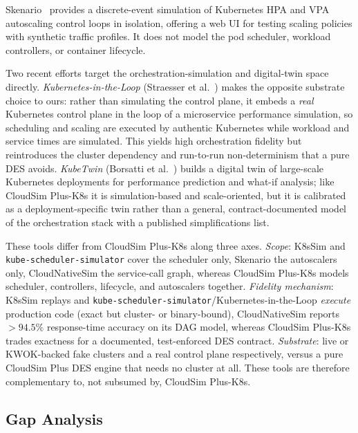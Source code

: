 \documentclass[ASNA,twocolumn]{USG}
\newcommand{\ckm}{CloudSim Plus-K8s\xspace}
\begin{document}
    Skenario~\cite{Skenario} provides a discrete-event simulation of
    Kubernetes HPA and VPA autoscaling control loops in isolation,
    offering a web UI for testing scaling policies with synthetic traffic
    profiles. It does not model the pod scheduler, workload controllers,
    or container lifecycle.

    Two recent efforts target the orchestration-simulation and
    digital-twin space directly. \emph{Kubernetes-in-the-Loop}
    (Straesser et al.~\cite{Straesser2023}) makes the opposite substrate
    choice to ours: rather than simulating the control plane, it embeds a
    \emph{real} Kubernetes control plane in the loop of a microservice
    performance simulation, so scheduling and scaling are executed by
    authentic Kubernetes while workload and service times are simulated.
    This yields high orchestration fidelity but reintroduces the cluster
    dependency and run-to-run non-determinism that a pure DES avoids.
    \emph{KubeTwin} (Borsatti et al.~\cite{Borsatti2024}) builds a digital
    twin of large-scale Kubernetes deployments for performance prediction
    and what-if analysis; like \ckm it is simulation-based and
    scale-oriented, but it is calibrated as a deployment-specific twin
    rather than a general, contract-documented model of the orchestration
    stack with a published simplifications list.

    These tools differ from \ckm along three axes. \emph{Scope}:
    K8sSim and \texttt{kube-scheduler-simulator} cover the scheduler only,
    Skenario the autoscalers only, CloudNativeSim the service-call graph,
    whereas \ckm models scheduler, controllers, lifecycle, and
    autoscalers together. \emph{Fidelity mechanism}: K8sSim replays and
    \texttt{kube-scheduler-simulator}/Kubernetes-in-the-Loop \emph{execute}
    production code (exact but cluster- or binary-bound), CloudNativeSim
    reports $>94.5\%$ response-time accuracy on its DAG model, whereas
    \ckm trades exactness for a documented, test-enforced DES contract.
    \emph{Substrate}: live or KWOK-backed fake clusters and a real control
    plane respectively, versus a pure CloudSim Plus DES engine that needs
    no cluster at all. These tools are therefore complementary to, not
    subsumed by, \ckm.

    \subsection{Gap Analysis}
    \label{sec:related-gap}
\end{document}
